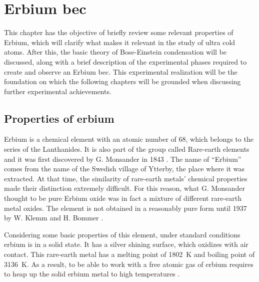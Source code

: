 
\chapter{Erbium \acl*{bec}}
\label{chap:erbium_bec}

This chapter has the objective of briefly review some relevant properties of Erbium, which will clarify what makes it relevant in the study of ultra cold atoms. After this, the basic theory of Bose-Einstein condensation will be discussed, along with a brief description of the experimental phases required to create and observe an Erbium \ac{bec}. This experimental realization will be the foundation on which the following chapters will be grounded when discussing further experimental achievements.

\section{Properties of erbium} \label{sec:erbium_properties}
Erbium is a chemical element with an atomic number of 68, which belongs to the series of the Lanthanides. It is also part of the group called Rare-earth elements and it was first discovered by G. Monsander in 1843 \cite{mosander1843xxx}. The name of ``Erbium'' comes from the name of the Swedish village of Ytterby, the place where it was extracted. At that time, the similarity of rare-earth metals' chemical properties made their distinction extremely difficult. For this reason, what G. Monsander thought to be pure Erbium oxide was in fact a mixture of different rare-earth metal oxides. The element is not obtained in a reasonably pure form until 1937 by W. Klemm and H. Bommer \cite{klemm1937bommer}.

Considering some basic properties of this element, under standard conditions erbium is in a solid state. It has a silver shining surface, which oxidizes with air contact. This rare-earth metal has a melting point of \SI{1802}{\kelvin} and boiling point of \SI{3136}{\kelvin}. As a result, to be able to work with a free atomic gas of erbium requires to heap up the solid erbium metal to high temperatures \cite{emsley1998}.

